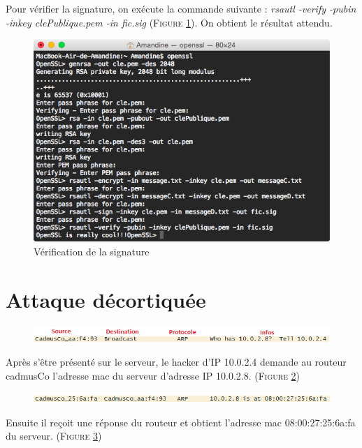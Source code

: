 \documentclass[11pt]{article}
\begin{document}
Pour vérifier la signature, on exécute la commande suivante : \textit{rsautl -verify -pubin -inkey clePublique.pem -in fic.sig} (\textsc{Figure \ref{fig:verification}}). On obtient le résultat attendu. 
    \begin{figure}[hbtp]
        \centering \includegraphics[scale=0.4]{Capture/question6c.png}
        \caption{Vérification de la signature}
         \label{fig:verification}
\end{figure}
\newpage
\section{Attaque décortiquée}

  \begin{figure}[hbtp]
        \centering \includegraphics[scale=0.4]{Exo3/1.png}
        \caption{}
         \label{fig:1}
\end{figure}

Après s’être présenté sur le serveur, le hacker d’IP 10.0.2.4 demande au routeur cadmusCo l’adresse mac du serveur d’adresse IP 10.0.2.8. (\textsc{Figure \ref{fig:1}})

 \begin{figure}[hbtp]
        \centering \includegraphics[scale=0.4]{Exo3/2.png}
        \caption{}
         \label{fig:2}
\end{figure}

Ensuite il reçoit une réponse du routeur et obtient l’adresse mac  08:00:27:25:6a:fa du serveur.  (\textsc{Figure \ref{fig:2}})
\end{document}
